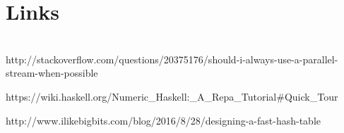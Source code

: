\section{Links}
 \citep{mapreduce}
\\
http://stackoverflow.com/questions/20375176/should-i-always-use-a-parallel-stream-when-possible

https://wiki.haskell.org/Numeric_Haskell:_A_Repa_Tutorial#Quick_Tour

http://www.ilikebigbits.com/blog/2016/8/28/designing-a-fast-hash-table